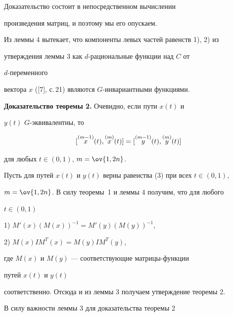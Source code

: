 Доказательство состоит в непосредственном вычислении 


произведения матриц, и поэтому мы его опускаем.





Из леммы 4 вытекает, что компоненты левых частей равенств 1), 2) из 


утверждения леммы 3 как $d$-рациональные функции над $C$ от 


$d$-переменного 


вектора $x$ ([7], с.\,21)  являются $G$-инвариантными функциями.


\medskip





{\bf Доказательство теоремы 2.} Очевидно, если пути $x(t)$ и


$y(t)$\; $G$-эквивалентны, то


\begin{equation}


[\up{(m-1)}{x}(t),\up{(m)}{x}(t)]=


[\up{(m-1)}{y}(t),\up{(m)}{y}(t)]


\end{equation}


для любых $t\in(0,1)$, $m=\ov{1,2n}$.





Пусть для путей $x(t)$ и $y(t)$ верны равенства (3) при всех $t\in(0,1)$,


$m=\ov{1,2n}$. В силу теоремы~1 и леммы 4 получим, что для любого 


$t\in(0,1)$





1) $M'(x)(M(x))^{-1}=M'(y)(M(y))^{-1}$,





2) $M(x)I M^T(x)=M(y)I M^T(y)$,





\noindent{}где $M(x)$ и $M(y)$ --- соответствующие матрицы-функции 


путей $x(t)$ и $y(t)$


соответственно. Отсюда и из леммы 3 получаем утверждение теоремы 2.





В силу важности леммы 3 для доказательства теоремы 2 


